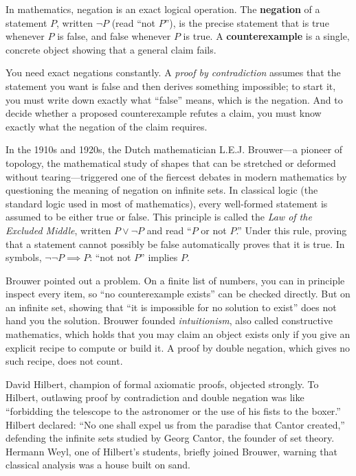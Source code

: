 In mathematics, negation is an exact logical operation. The \textbf{negation} of a statement $P$, written $\neg P$ (read ``not $P$''), is the precise statement that is true whenever $P$ is false, and false whenever $P$ is true. A \textbf{counterexample} is a single, concrete object showing that a general claim fails.

You need exact negations constantly. A \emph{proof by contradiction} assumes that the statement you want is false and then derives something impossible; to start it, you must write down exactly what ``false'' means, which is the negation. And to decide whether a proposed counterexample refutes a claim, you must know exactly what the negation of the claim requires.

\begin{historybox}
In the 1910s and 1920s, the Dutch mathematician L.E.J. Brouwer---a pioneer of topology, the mathematical study of shapes that can be stretched or deformed without tearing---triggered one of the fiercest debates in modern mathematics by questioning the meaning of negation on infinite sets. In classical logic (the standard logic used in most of mathematics), every well-formed statement is assumed to be either true or false. This principle is called the \emph{Law of the Excluded Middle}, written $P \lor \neg P$ and read ``$P$ or not $P$.'' Under this rule, proving that a statement cannot possibly be false automatically proves that it is true. In symbols, $\neg \neg P \implies P$: ``not not $P$'' implies $P$.

Brouwer pointed out a problem. On a finite list of numbers, you can in principle inspect every item, so ``no counterexample exists'' can be checked directly. But on an infinite set, showing that ``it is impossible for no solution to exist'' does not hand you the solution. Brouwer founded \emph{intuitionism}, also called constructive mathematics, which holds that you may claim an object exists only if you give an explicit recipe to compute or build it. A proof by double negation, which gives no such recipe, does not count.

David Hilbert, champion of formal axiomatic proofs, objected strongly. To Hilbert, outlawing proof by contradiction and double negation was like ``forbidding the telescope to the astronomer or the use of his fists to the boxer.'' Hilbert declared: ``No one shall expel us from the paradise that Cantor created,'' defending the infinite sets studied by Georg Cantor, the founder of set theory. Hermann Weyl, one of Hilbert's students, briefly joined Brouwer, warning that classical analysis was a house built on sand.


\end{historybox}
